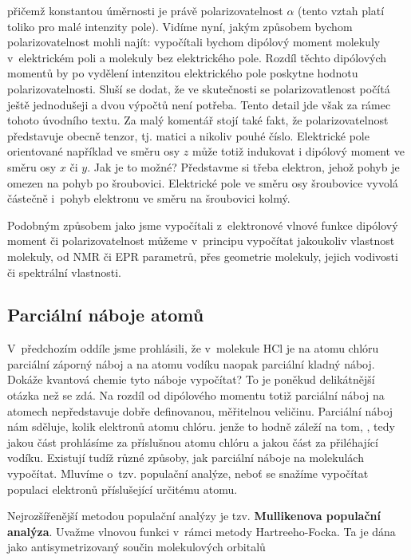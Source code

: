 \noindent přičemž konstantou úměrnosti je právě polarizovatelnost $\alpha$ (tento vztah platí toliko pro malé intenzity pole). Vidíme nyní, jakým způsobem bychom polarizovatelnost mohli najít: vypočítali bychom dipólový moment molekuly v~elektrickém poli a molekuly bez elektrického pole. Rozdíl těchto dipólových momentů by po vydělení intenzitou elektrického pole poskytne hodnotu polarizovatelnosti. Sluší se dodat, že ve skutečnosti se polarizovatlenost počítá ještě jednodušeji a dvou výpočtů není potřeba. Tento detail jde však za rámec tohoto úvodního textu. Za malý komentář stojí také fakt, že polarizovatelnost představuje obecně tenzor, tj. matici a nikoliv pouhé číslo. Elektrické pole orientované například ve směru osy $z$ může totiž indukovat i dipólový moment ve směru osy $x$ či $y$. Jak je to možné? Představme si třeba elektron, jehož pohyb je omezen na pohyb po šroubovici. Elektrické pole ve směru osy šroubovice vyvolá částečně i~pohyb elektronu ve směru na šroubovici kolmý. 

Podobným způsobem jako jsme vypočítali z~elektronové vlnové funkce dipólový moment či polarizovatelnost můžeme v~principu vypočítat jakoukoliv vlastnost molekuly, od NMR či EPR parametrů, přes geometrie molekuly, jejich vodivosti či spektrální vlastnosti.  



\subsection{Parciální náboje atomů}

V~předchozím oddíle jsme prohlásili, že v~molekule HCl je na atomu chlóru parciální záporný náboj a na atomu vodíku naopak parciální kladný náboj. Dokáže kvantová chemie tyto náboje vypočítat? To je poněkud delikátnější otázka než se zdá. Na rozdíl od dipólového momentu totiž parciální náboj na atomech nepředstavuje dobře definovanou, měřitelnou veličinu. Parciální náboj nám sděluje, kolik elektronů  atomu chlóru. jenže to hodně záleží na tom, , tedy jakou část prohlásíme za příslušnou atomu chlóru a jakou část za přiléhající vodíku. Existují tudíž různé způsoby, jak parciální náboje na molekulách vypočítat. Mluvíme o~tzv. populační analýze, neboť se snažíme vypočítat populaci elektronů příslušející určitému atomu.

Nejrozšířenější metodou populační analýzy je tzv. \textbf{Mullikenova populační analýza}. Uvaž\-me vlnovou funkci v~rámci metody Hartreeho-Focka. Ta je dána jako antisymetrizovaný součin molekulových orbitalů

